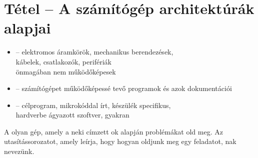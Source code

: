 \documentclass[main.tex]{subfiles}
\begin{document}
  \section{Tétel – A számítógép architektúrák alapjai} %

  \begin{itemize}
    \item {} \tabto{2cm} – \tabto{2.6cm}
    elektromos áramkörök, mechanikus berendezések, \\
    \tabto{2.6cm}kábelek, csatlakozók, perifériák \\
    \tabto{2.6cm}önmagában nem működőképesek
    
    \item {} \tabto{2cm} – \tabto{2.6cm}
    számítógépet működőképessé tevő
    programok és azok dokumentációi

    \item {} \tabto{2cm} – \tabto{2.6cm}
    célprogram, mikrokóddal írt, készülék specifikus, \\
    \tabto{2.6cm}hardverbe ágyazott szoftver,
    gyakran 
  \end{itemize}

  A  olyan gép,
  amely a neki címzett ok alapján
  problémákat old meg. Az utasítássorozatot,
  amely leírja, hogy hogyan oldjunk meg egy feladatot,
  nak nevezünk.
\end{document}

